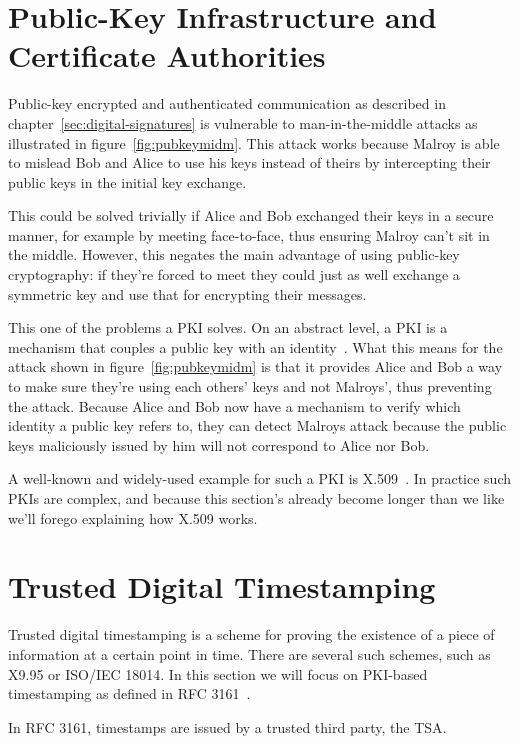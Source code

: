 \section{Public-Key Infrastructure and Certificate Authorities}\label{sec:public-key-infrastructure-and-certificate-authorities}
Public-key encrypted and authenticated communication as described in chapter~\ref{sec:digital-signatures}
is vulnerable to man-in-the-middle attacks as illustrated in figure~\ref{fig:pubkeymidm}.
This attack works because Malroy is able to mislead Bob and Alice to use his keys instead of theirs
by intercepting their public keys in the initial key exchange.

This could be solved trivially if Alice and Bob exchanged their keys in a secure manner,
for example by meeting face-to-face,
thus ensuring Malroy can't sit in the middle.
However, this negates the main advantage of using public-key cryptography:
if they're forced to meet they could just as well exchange a symmetric key and use that for encrypting
their messages.

This one of the problems a \gls{PKI} solves.
On an abstract level, a \gls{PKI} is a mechanism that couples a public key with an identity~\cite{whatispki}.
What this means for the attack shown in figure~\ref{fig:pubkeymidm} is that it provides Alice and Bob
a way to make sure they're using each others' keys and not Malroys',
thus preventing the attack.
Because Alice and Bob now have a mechanism to verify which identity a public key refers to,
they can detect Malroys attack because the public keys maliciously issued by him will not correspond to Alice nor Bob.

A well-known and widely-used example for such a \gls{PKI} is X.509~\cite{x509}.
In practice such \gls{PKI}s are complex,
and because this section's already become longer than we like we'll forego explaining how X.509 works.

\section{Trusted Digital Timestamping}\label{sec:timestamps}
Trusted digital timestamping is a scheme for proving the existence of a piece of information at a certain point in time.
There are several such schemes, such as X9.95 or ISO/IEC 18014.
In this section we will focus on \gls{PKI}-based timestamping as defined in RFC 3161~\cite{rfc3161}.

In RFC 3161, timestamps are issued by a trusted third party, the \acrfull{TSA}.

